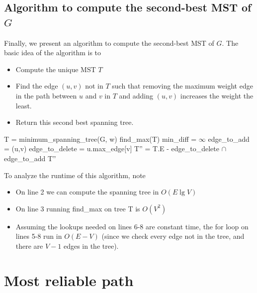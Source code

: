 \documentclass[paper=a4, fontsize=11pt]{scrartcl} %
\numberwithin{equation}{section} %
\numberwithin{figure}{section} %
\numberwithin{table}{section} %
\begin{document}
\subsection{Algorithm to compute the second-best MST of $G$}

Finally, we present an algorithm to compute the second-best MST of $G$. The basic idea of the algorithm is to
\begin{itemize}
\item Compute the unique MST $T$
\item Find the edge $(u,v)$ not in $T$ such that removing the maximum weight edge in the path between $u$ and $v$ in $T$ and adding $(u,v)$ increases the weight the least.
\item Return this second best spanning tree.
\end{itemize}

\begin{algorithmic}[1]
	\State T = minimum\_spanning\_tree(G, w) 
	\State find\_max(T) 
	\State min\_diff = $\infty$
			\State edge\_to\_add = (u,v)
			\State edge\_to\_delete = u.max\_edge[v]
		\EndIf
	\EndFor
	\State T'' = T.E - edge\_to\_delete $\cap$ edge\_to\_add
	\State \Return T''
\EndFunction
\end{algorithmic}

To analyze the runtime of this algorithm, note
\begin{itemize}
\item On line 2 we can compute the spanning tree in $O(E \lg V)$
\item On line 3 running find\_max on tree T is $O(V^2)$
\item Assuming the lookups needed on lines 6-8 are constant time, the for loop on lines 5-8 run in $O(E - V)$ (since we check every edge not in the tree, and there are $V-1$ edges in the tree).
\end{itemize}


\section{Most reliable path}
\end{document}
